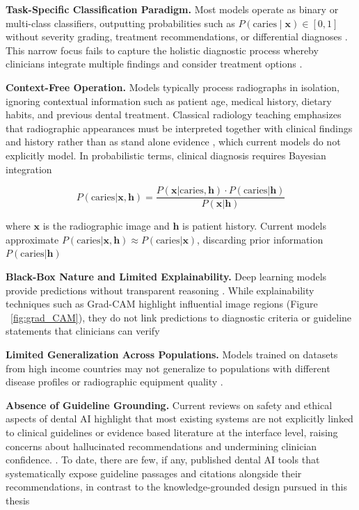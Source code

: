 \documentclass[12pt,a4paper]{report}
\begin{document}
	\textbf{Task-Specific Classification Paradigm.} Most models operate as binary or multi-class classifiers, outputting probabilities such as $P(\text{caries} \mid \mathbf{x}) \in [0,1]$ without severity grading, treatment recommendations, or differential diagnoses \cite{putra2021ai_dental_radiography}. This narrow focus fails to capture the holistic diagnostic process whereby clinicians integrate multiple findings and consider treatment options \cite{schwendicke2020artificial}.
	
	\textbf{Context-Free Operation.} Models typically process radiographs in isolation, ignoring contextual information such as patient age, medical history, dietary habits, and previous dental treatment. Classical radiology teaching emphasizes that radiographic appearances must be interpreted together with clinical findings and history rather than as stand alone evidence \cite{white_pharoah_radiology}, which current models do not explicitly model. 
	In probabilistic terms, clinical diagnosis requires Bayesian integration
	
	\begin{equation}
		P(\text{caries} | \mathbf{x}, \mathbf{h}) = \frac{P(\mathbf{x} | \text{caries}, \mathbf{h}) \cdot P(\text{caries} | \mathbf{h})}{P(\mathbf{x} | \mathbf{h})}
	\end{equation}
	
	where $\mathbf{x}$ is the radiographic image and $\mathbf{h}$ is patient history. Current models approximate $P(\text{caries} | \mathbf{x}, \mathbf{h}) \approx P(\text{caries} | \mathbf{x})$, discarding prior information $P(\text{caries} | \mathbf{h})$ 
	
	
	\textbf{Black-Box Nature and Limited Explainability.} Deep learning models provide predictions without transparent reasoning \cite{holzinger2017explainableai}. While explainability techniques such as Grad-CAM highlight influential image regions (Figure ~\ref{fig:grad_CAM}), they do not link predictions to diagnostic criteria or guideline statements that clinicians can verify
	
	\textbf{Limited Generalization Across Populations.} Models trained on datasets from high income countries may not generalize to populations with different disease profiles or radiographic equipment quality \cite{schwendicke2022ai_global}.
	
	\textbf{Absence of Guideline Grounding.} Current reviews on safety and ethical aspects of dental AI highlight that most existing systems are not explicitly linked to clinical guidelines or evidence based literature at the interface level, raising concerns about hallucinated recommendations and undermining clinician confidence.
	\cite{Rokhshad2025,schwendicke2022ai_global}. To date, there are few, if any, published dental AI tools that systematically expose guideline passages and citations alongside their recommendations, in contrast to the knowledge-grounded design pursued in this thesis 
	
\end{document}
